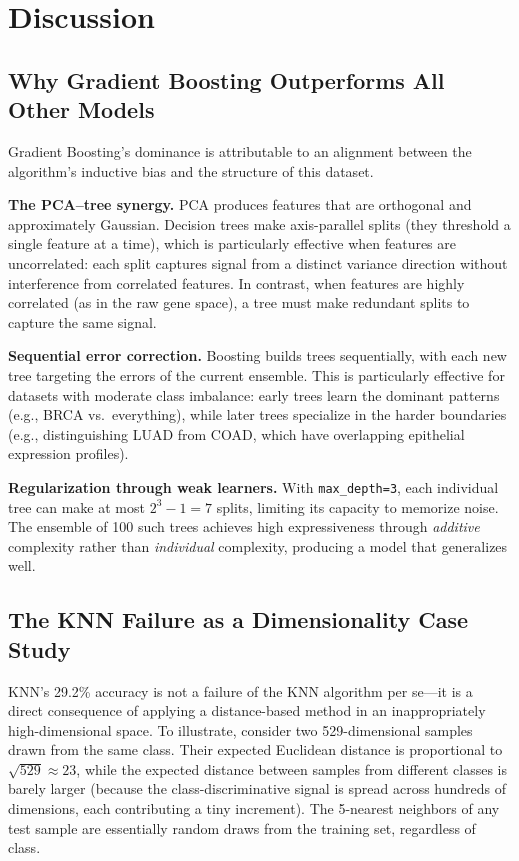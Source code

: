 \documentclass{article}
\begin{document}
\section{Discussion}

\subsection{Why Gradient Boosting Outperforms All Other Models}
Gradient Boosting's dominance is attributable to an alignment between the algorithm's inductive bias and the structure of this dataset.

\textbf{The PCA--tree synergy.} PCA produces features that are orthogonal and approximately Gaussian. Decision trees make axis-parallel splits (they threshold a single feature at a time), which is particularly effective when features are uncorrelated: each split captures signal from a distinct variance direction without interference from correlated features. In contrast, when features are highly correlated (as in the raw gene space), a tree must make redundant splits to capture the same signal.

\textbf{Sequential error correction.} Boosting builds trees sequentially, with each new tree targeting the errors of the current ensemble. This is particularly effective for datasets with moderate class imbalance: early trees learn the dominant patterns (e.g., BRCA vs.\ everything), while later trees specialize in the harder boundaries (e.g., distinguishing LUAD from COAD, which have overlapping epithelial expression profiles).

\textbf{Regularization through weak learners.} With \texttt{max\_depth=3}, each individual tree can make at most $2^3 - 1 = 7$ splits, limiting its capacity to memorize noise. The ensemble of 100 such trees achieves high expressiveness through \textit{additive} complexity rather than \textit{individual} complexity, producing a model that generalizes well.

\subsection{The KNN Failure as a Dimensionality Case Study}
KNN's 29.2\% accuracy is not a failure of the KNN algorithm per se---it is a direct consequence of applying a distance-based method in an inappropriately high-dimensional space. To illustrate, consider two 529-dimensional samples drawn from the same class. Their expected Euclidean distance is proportional to $\sqrt{529} \approx 23$, while the expected distance between samples from different classes is barely larger (because the class-discriminative signal is spread across hundreds of dimensions, each contributing a tiny increment). The 5-nearest neighbors of any test sample are essentially random draws from the training set, regardless of class.
\end{document}

